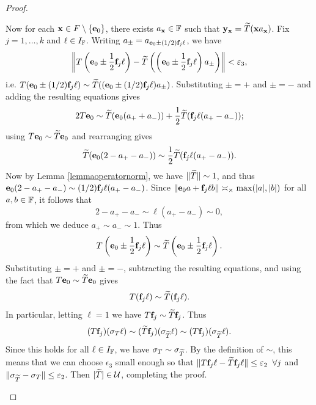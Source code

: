 \begin{proof}
\begin{itemize}
Now for each $\mathbf x\in F\setminus\{\mathbf e_0\}$, there exists $a_\xx\in\F$ such that $\mathbf y_\mathbf x = \widetilde T(\mathbf x a_\mathbf x)$. Fix $j = 1,\ldots,k$ and $\ell\in I_\F$. Writing $a_\pm = a_{\mathbf e_0 \pm (1/2)\mathbf f_j \ell}$, we have
\[
\left\|T\left(\mathbf e_0 \pm \frac12\mathbf f_j \ell\right) - \widetilde T\left(\left(\mathbf e_0 \pm \frac12\mathbf f_j \ell\right)a_\pm\right)\right\| < \varepsilon_3,
\]
i.e. $T(\mathbf e_0 \pm (1/2)\mathbf f_j \ell) \sim \widetilde T((\mathbf e_0 \pm (1/2)\mathbf f_j \ell) a_\pm)$. Substituting $\pm = +$ and $\pm = -$ and adding the resulting equations gives
\[
2T\mathbf e_0 \sim \widetilde T(\mathbf e_0 (a_+ + a_-)) + \frac12 \widetilde T(\mathbf f_j \ell (a_+ - a_-));
\]
using $T\mathbf e_0 \sim \widetilde T\mathbf e_0$ and rearranging gives
\[
\widetilde T(\mathbf e_0 (2 - a_+ - a_-)) \sim \frac12 \widetilde T(\mathbf f_j \ell (a_+ - a_-)).
\]
Now by Lemma \ref{lemmaoperatornorm}, we have $\|\widetilde T\|\sim 1$, and thus $\mathbf e_0(2 - a_+ - a_-) \sim (1/2)\mathbf f_j \ell(a_+ - a_-)$. Since $\|\mathbf e_0 a + \mathbf f_j \ell b\| \asymp_\times \max(|a|,|b|)$ for all $a,b\in\F$, it follows that
\[
2 - a_+ - a_- \sim \ell(a_+ - a_-) \sim 0,
\]
from which we deduce $a_+\sim a_- \sim 1$. Thus
\[
T\left(\mathbf e_0 \pm \frac12\mathbf f_j \ell\right) \sim \widetilde T\left(\mathbf e_0 \pm \frac12\mathbf f_j \ell\right).
\]
Substituting $\pm = +$ and $\pm = -$, subtracting the resulting equations, and using the fact that $T\mathbf e_0\sim \widetilde T\mathbf e_0$ gives
\[
T(\mathbf f_j \ell) \sim \widetilde T(\mathbf f_j \ell).
\]
In particular, letting $\ell = 1$ we have $T\mathbf f_j \sim \widetilde T\mathbf f_j$. Thus
\[
(T\mathbf f_j) (\sigma_T\ell) \sim (\widetilde T\mathbf f_j) (\sigma_{\widetilde T}\ell) \sim (T\mathbf f_j) (\sigma_{\widetilde T}\ell).
\]
Since this holds for all $\ell\in I_\F$, we have $\sigma_T\sim \sigma_{\widetilde T}$. By the definition of $\sim$, this means that we can choose $\epsilon_3$ small enough so that $\|T\mathbf f_j \ell - \widetilde T\mathbf f_j \ell\| \leq \varepsilon_2 \;\;\forall j$ and $\|\sigma_{\widetilde T} - \sigma_T\| \leq \varepsilon_2$. Then $[\widetilde T]\in\mathcal U$, completing the proof.
\end{itemize}
\end{proof}

